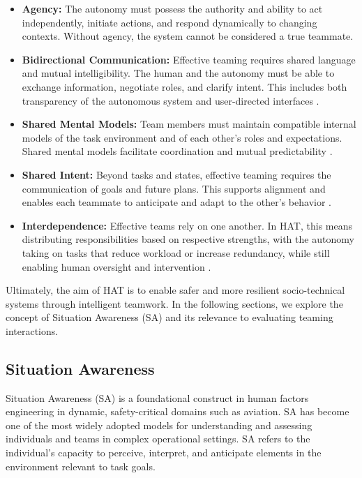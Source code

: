 \documentclass[12pt,a4paper]{article} %
\begin{document}
	\begin{itemize}
		\item \textbf{Agency:} The autonomy must possess the authority and ability to act independently, initiate actions, and respond dynamically to changing contexts. Without agency, the system cannot be considered a true teammate.
		
		\item \textbf{Bidirectional Communication:} Effective teaming requires shared language and mutual intelligibility. The human and the autonomy must be able to exchange information, negotiate roles, and clarify intent. This includes both transparency of the autonomous system and user-directed interfaces \parencite{christoffersen_1_2002,liu_cognitive_2016}.
		
		\item \textbf{Shared Mental Models:} Team members must maintain compatible internal models of the task environment and of each other's roles and expectations. Shared mental models facilitate coordination and mutual predictability \parencite{cooke_interactive_2013,liu_cognitive_2016}.
		
		\item \textbf{Shared Intent:} Beyond tasks and states, effective teaming requires the communication of goals and future plans. This supports alignment and enables each teammate to anticipate and adapt to the other's behavior \parencite{lyons_humanautonomy_2021,endsley_ironies_2023}.
		
		\item \textbf{Interdependence:} Effective teams rely on one another. In HAT, this means distributing responsibilities based on respective strengths, with the autonomy taking on tasks that reduce workload or increase redundancy, while still enabling human oversight and intervention \parencite{lawless_editorial_2023,johnson_no_2019}.
	\end{itemize}

	Ultimately, the aim of HAT is to enable safer and more resilient socio-technical systems through intelligent teamwork. In the following sections, we explore the concept of Situation Awareness (SA) and its relevance to evaluating teaming interactions.

	\subsection{Situation Awareness}

	Situation Awareness (SA) is a foundational construct in human factors engineering in dynamic, safety-critical domains such as aviation. SA has become one of the most widely adopted models for understanding and assessing individuals and teams in complex operational settings. SA refers to the individual's capacity to perceive, interpret, and anticipate elements in the environment relevant to task goals.
\end{document}
